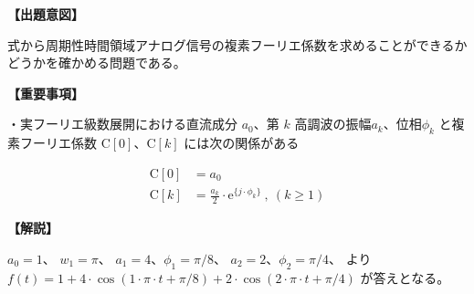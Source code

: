 \noindent \textbf{【出題意図】}

\bigskip
\noindent 式から周期性時間領域アナログ信号の複素フーリエ係数を求めることができるかどうかを確かめる問題である。

\vspace{1em}
\noindent \textbf{【重要事項】}

\medskip
\noindent・実フーリエ級数展開における直流成分 $a_0$、第 $k$ 高調波の振幅$a_k$、位相$\phi_k$ と複素フーリエ係数 $\textrm{C}[0]$、$\textrm{C}[k]$ には次の関係がある

\begin{align*}
\textrm{C}[0] &= a_0 \\
\textrm{C}[k] &= \frac{a_k}{2} \cdot \textrm{e}^{\{j \cdot \phi_k \}} \ ,\ (k\geq 1)
\end{align*}


\bigskip

\vspace{1em}
\noindent \textbf{【解説】}

\bigskip
\noindent 
$a_0 = 1$、
$w_1 = \pi$、
$a_1 = 4$、$\phi_1 = \pi/8$、
$a_2 = 2$、$\phi_2 = \pi/4$、
より 
$f(t) = 1 + 4 \cdot \cos( 1 \cdot \pi \cdot t + \pi/8 ) + 2 \cdot \cos( 2 \cdot \pi \cdot t + \pi/4)$ 
が答えとなる。
